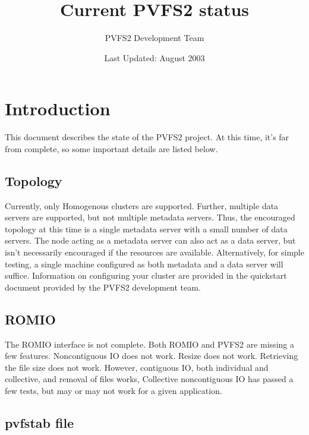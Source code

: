 \documentclass[11pt, letterpaper]{article}
\title{Current PVFS2 status}
\author{ PVFS2 Development Team }
\date{ Last Updated: August 2003 }
\begin{document}
\maketitle

\tableofcontents

\newpage

\thispagestyle{empty}

\setlength{\parindent}{0.0cm}

\section{Introduction}

This document describes the state of the PVFS2 project.  At this time,
it's far from complete, so some important details are listed below.


\subsection{Topology}

Currently, only Homogenous clusters are supported.  Further, multiple
data servers are supported, but not multiple metadata servers.  Thus,
the encouraged topology at this time is a single metadata server with
a small number of data servers.  The node acting as a metadata server
can also act as a data server, but isn't necessarily encouraged if the
resources are available.  Alternatively, for simple testing, a single
machine configured as both metadata and a data server will suffice.
Information on configuring your cluster are provided in the quickstart
document provided by the PVFS2 development team.

\subsection{ROMIO}

The ROMIO interface is not complete.  Both ROMIO and PVFS2 are missing a few
features.  Noncontiguous IO does not work.   Resize does not work.   Retrieving
the file size does not work.  However, contiguous IO, both individual and
collective, and removal of files works,   Collective noncontiguous IO has
passed a few tests, but may or may not work for a given application.

\subsection{pvfstab file}
\end{document}
